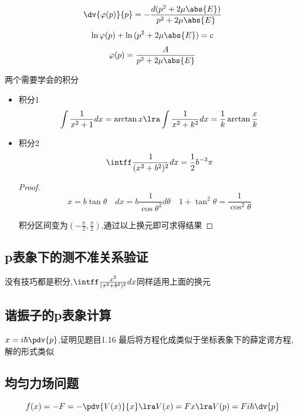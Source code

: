             $$ \dv{\varphi(p)}{p} = - \frac{d(p^{2}+2\mu \abs{E})}{p^{2}+2\mu \abs{E}} $$
            $$ \ln{\varphi(p)}+\ln{(p^{2}+2\mu \abs{E})} = c                           $$
            $$ \varphi(p) = \frac{A}{p^{2}+2\mu \abs{E}}                               $$

            \begin{formal}
                
                两个需要学会的积分
                \begin{itemize}
                    \item 积分1
                        $$\int \frac{1}{x^{2}+1} dx  = \arctan{x} \lra \int \frac{1}{x^{2}+k^{2}} dx = \frac{1}{k} \arctan{\frac{x}{k}} $$
                    \item 积分2
                        $$ \intff \frac{1}{(x^{2}+b^{2})^{2}} dx = \frac{1}{2} b^{-3} \pi $$
    
                    \begin{proof}
                        \pfindent
                        $$ x = b\tan{\theta} \quad dx = b \frac{1}{\cos{\theta}^{2}} d\theta \quad 1+\tan^{2}{\theta} = \frac{1}{\cos^{2}{\theta}} $$

                        积分区间变为$ (-\frac{\pi}{2},\frac{\pi}{2}) $,通过以上换元即可求得结果
                    \end{proof}

                \end{itemize}
            \end{formal}
            
        \subsection{p表象下的测不准关系验证}
            没有技巧都是积分,$\intff \frac{x^{2}}{(x^{2}+b^{2})^{2}} dx $同样适用上面的换元        

        \subsection{谐振子的p表象计算}
            $ x = i\hbar \pdv{p}$,证明见题目1.16
            最后将方程化成类似于坐标表象下的薛定谔方程,解的形式类似

        \subsection{均匀力场问题}
            $$ f(x) = -F = - \pdv{V(x)}{x} \lra V(x) = F x \lra V(p) = Fi\hbar \dv{p}$$

